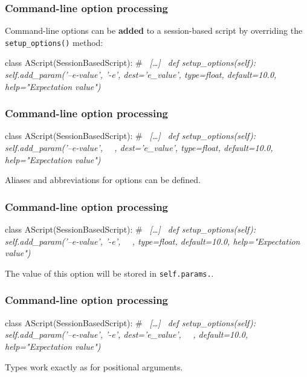 \documentclass[english,serif,mathserif,xcolor=pdftex,dvipsnames,table]{beamer}
\begin{document}
\begin{frame}[fragile]
  \frametitle{Command-line option processing}

  Command-line options can be \textbf{added} to a session-based script
  by overriding the \lstinline|setup_options()| method:
  \begin{python}
class AScript(SessionBasedScript):
  # ~\em [\ldots]~
  def setup_options(self):
    self.add_param('--e-value', '-e', dest='e_value',
                   type=float, default=10.0,
                   help="Expectation value")
  \end{python}
\end{frame}


\begin{frame}[fragile]
  \frametitle{Command-line option processing}

  \begin{python}
class AScript(SessionBasedScript):
  # ~\em [\ldots]~
  def setup_options(self):
    self.add_param('--e-value', ~~, dest='e_value',
                   type=float, default=10.0,
                   help="Expectation value")
  \end{python}

  \+
  Aliases and abbreviations for options can be defined.
\end{frame}


\begin{frame}[fragile]
  \frametitle{Command-line option processing}

  \begin{python}
class AScript(SessionBasedScript):
  # ~\em [\ldots]~
  def setup_options(self):
    self.add_param('--e-value', '-e', ~~,
                   type=float, default=10.0,
                   help="Expectation value")
  \end{python}

  \+
  The value of this option will be stored in \lstinline|self.params.|\texttt{}.

\end{frame}


\begin{frame}[fragile]
  \frametitle{Command-line option processing}

  \begin{python}
class AScript(SessionBasedScript):
  # ~\em [\ldots]~
  def setup_options(self):
    self.add_param('--e-value', '-e', dest='e_value',
                   ~~, default=10.0,
                   help="Expectation value")
  \end{python}

  \+
  Types work exactly as for positional arguments.
\end{frame}
\end{document}
